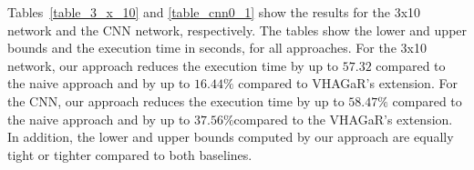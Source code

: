 Tables~\ref{table_3_x_10} and \ref{table_cnn0_1} show the results for the 3x10 network and the CNN network, respectively.
The tables show the lower and upper bounds and the execution time in seconds, for all approaches.
For the 3x10 network, our approach reduces the execution time by up to $57.32$ compared to the naive approach and by up to $16.44\%$ compared to VHAGaR's extension.
For the CNN, our approach reduces the execution time by up to $58.47\%$  compared to the naive approach and by up to $37.56\%$compared to the VHAGaR's extension.
In addition, the lower and upper bounds computed by our approach are equally tight or tighter compared to both baselines. %

